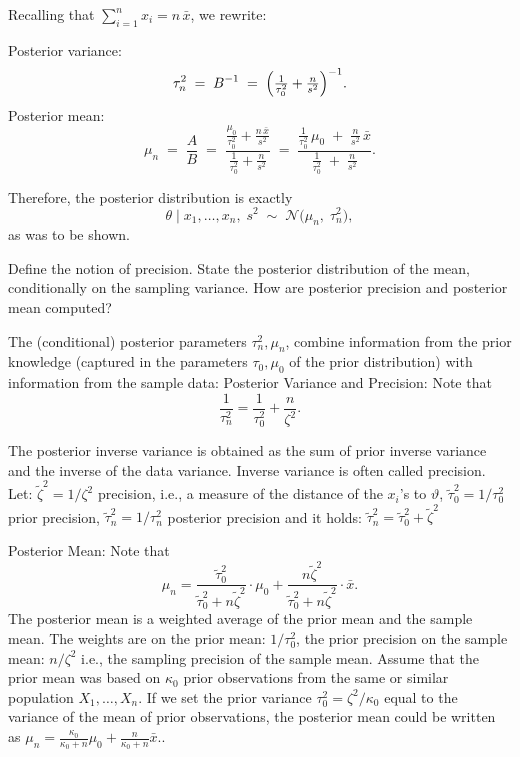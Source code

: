 Recalling that \(\sum_{i=1}^n x_i = n\,\bar{x}\), we rewrite:

Posterior variance:
  \[
  \tau_n^2
  \;=\;
  B^{-1}
  \;=\;
  \Bigl(\tfrac{1}{\tau_0^2} + \tfrac{n}{s^2}\Bigr)^{-1}.
  \]
Posterior mean:
  \[
  \mu_n
  \;=\;
  \frac{A}{B}
  \;=\;
  \frac{\tfrac{\mu_0}{\tau_0^2} + \tfrac{n\,\bar{x}}{s^2}}
       {\tfrac{1}{\tau_0^2} + \tfrac{n}{s^2}}
  \;=\;
  \frac{\tfrac{1}{\tau_0^2}\,\mu_0 \;+\; \tfrac{n}{s^2}\,\bar{x}}
       {\tfrac{1}{\tau_0^2} \;+\; \tfrac{n}{s^2}}.
  \]

Therefore, the posterior distribution is exactly
\[
\theta \;\big|\; x_1,\dots,x_n,\;s^2
\;\sim\;
\mathcal{N}\!\bigl(\mu_n,\;\tau_n^2\bigr),
\]
as was to be shown.


Define the notion of precision. State the posterior distribution of the mean, conditionally on the sampling variance. 
How are posterior precision and posterior mean computed?

The (conditional) posterior parameters \( \tau_n^2, \mu_n \),
 combine information from the prior knowledge (captured in the parameters  
\(\tau_0, \mu_0\) of the prior distribution) with information from the sample data:
Posterior Variance and Precision: Note that
\[
\frac{1}{\tau_n^2} = \frac{1}{\tau_0^2} + \frac{n}{\zeta^2}.
\]

The posterior inverse variance is obtained as the sum of prior inverse variance and the inverse of the data variance.
Inverse variance is often called precision. Let:
\(\tilde{\zeta}^2 = 1/\zeta^2\) \sampling precision, i.e., a measure of the distance of the \( x_i \)'s to \( \vartheta \),
\(\tilde{\tau}_0^2 = 1/\tau_0^2\) prior precision,
\(\tilde{\tau}_n^2 = 1/\tau_n^2\) posterior precision
and it holds:
\( \tilde{\tau}_n^2 = \tilde{\tau}_0^2 + \tilde{\zeta}^2 \)

Posterior Mean: Note that
\[
\mu_n = \frac{\tilde{\tau}_0^2}{\tilde{\tau}_0^2 + n \tilde{\zeta}^2} \cdot \mu_0 + \frac{n \tilde{\zeta}^2}{\tilde{\tau}_0^2 + n \tilde{\zeta}^2} \cdot \bar{x}.
\]
The posterior mean is a weighted average of the prior mean and the sample mean.
The weights are 
on the prior mean: \(1/\tau_0^2\), the prior precision
on the sample mean: \( n/\zeta^2\) i.e., the sampling precision of the sample mean.
Assume that the prior mean was based on \(\kappa_0 \) prior observations from the same or similar population \(X_1, \ldots, X_n\).
If we set the prior variance \(\tau_0^2 = \zeta^2/\kappa_0 \) equal to the variance of the mean of prior observations, the posterior mean could be written as
\(
\mu_n = \frac{\kappa_0}{\kappa_0 + n} \mu_0 + \frac{n}{\kappa_0 + n} \bar{x}.
\).


